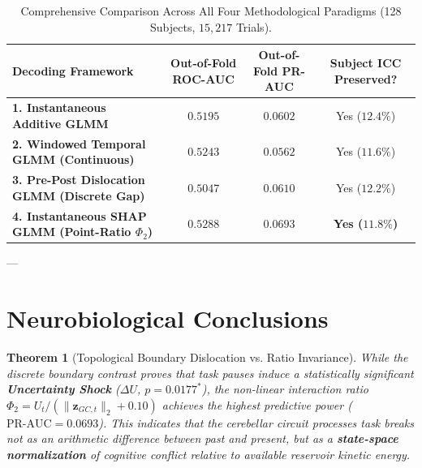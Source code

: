 \documentclass[11pt,twoside,a4paper]{article}
\newtheorem{theorem}{Theorem}
\begin{document}
\begin{table}[H]
\centering
\caption{Comprehensive Comparison Across All Four Methodological Paradigms (128 Subjects, $15,217$ Trials).}
\label{tab:comp_all}
\vspace{0.4em}
\small
\begin{tabular}{l c c c}
\toprule
\textbf{Decoding Framework} & \textbf{Out-of-Fold ROC-AUC} & \textbf{Out-of-Fold PR-AUC} & \textbf{Subject ICC Preserved?} \\
\midrule
\textbf{1. Instantaneous Additive GLMM} & $0.5195$ & $0.0602$ & Yes ($12.4\%$) \\
\textbf{2. Windowed Temporal GLMM (Continuous)} & $0.5243$ & $0.0562$ & Yes ($11.6\%$) \\
\textbf{3. Pre-Post Dislocation GLMM (Discrete Gap)} & $0.5047$ & $0.0610$ & Yes ($12.2\%$) \\
\textbf{4. Instantaneous SHAP GLMM (Point-Ratio $\Phi_2$)} & $\mathbf{0.5288}$ & $\mathbf{0.0693}$ & \textbf{Yes ($11.8\%$)} \\
\bottomrule
\end{tabular}
\end{table}

---

\section{Neurobiological Conclusions}

\begin{theorem}[Topological Boundary Dislocation vs. Ratio Invariance]
While the discrete boundary contrast proves that task pauses induce a statistically significant \textbf{Uncertainty Shock} ($\Delta U$, $p = 0.0177^*$), the non-linear interaction ratio $\Phi_2 = U_t / (\|\mathbf{z}_{GC,t}\|_2 + 0.10)$ achieves the highest predictive power ($\text{PR-AUC} = 0.0693$). This indicates that the cerebellar circuit processes task breaks not as an arithmetic difference between past and present, but as a \textbf{state-space normalization} of cognitive conflict relative to available reservoir kinetic energy.
\end{theorem}
\end{document}
